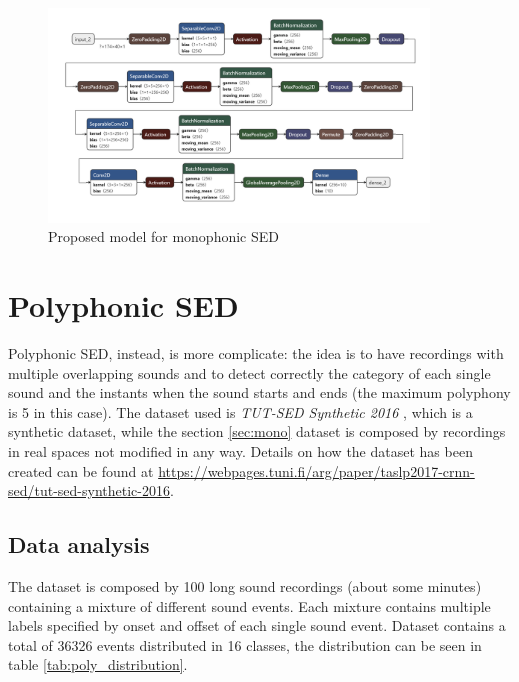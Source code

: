 \documentclass{article}
\begin{document}
\begin{figure}[H]
	\centering
	\includegraphics[width=0.9\textwidth]{./images/mono/new_model.png}	
	\caption{Proposed model for monophonic SED}
	\label{fig:mono_new_model}
\end{figure}


\section{Polyphonic SED}
\label{sec:poly}

Polyphonic SED, instead, is more complicate: the idea is to have recordings with multiple overlapping sounds and to detect correctly the category of each single sound and the instants when the sound starts and ends (the maximum polyphony is 5 in this case). The dataset used is \textit{TUT-SED Synthetic 2016} \cite{Cakir_2017}, which is a synthetic dataset, while the section \ref{sec:mono} dataset is composed by recordings in real spaces not modified in any way. Details on how the dataset has been created can be found at \url{https://webpages.tuni.fi/arg/paper/taslp2017-crnn-sed/tut-sed-synthetic-2016}.

\subsection{Data analysis}
\label{subsec:poly_analysis}

The dataset is composed by 100 long sound recordings (about some minutes) containing a mixture of different sound events. Each mixture contains multiple labels specified by onset and offset of each single sound event. Dataset contains a total of 36326 events distributed in 16 classes, the distribution can be seen in table \ref{tab:poly_distribution}.
\end{document}
